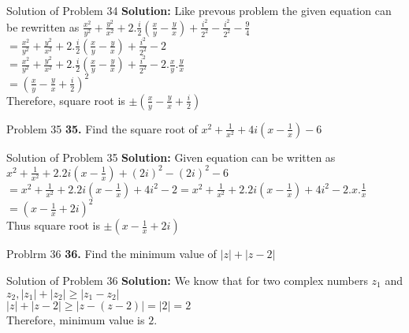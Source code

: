 \documentclass[aspectratio=169,8pt]{beamer}
\begin{document}
\begin{frame}{Solution of Problem 34}
  \textbf{Solution:} Like prevous problem the given equation can be rewritten as $\frac{x^2}{y^2} + \frac{y^2}{x^2} + 2.\frac{i}{2}\left(\frac{x}{y} - \frac{y}{x}\right) + \frac{i^2}{2^2} - \frac{i^2}{2^2} - \frac{9}{4}$\\
  \vspace*{0.2cm}
  $= \frac{x^2}{y^2} + \frac{y^2}{x^2} + 2.\frac{i}{2}\left(\frac{x}{y} - \frac{y}{x}\right) + \frac{i^2}{2^2} - 2$\\
  \vspace*{0.2cm}
  $= \frac{x^2}{y^2} + \frac{y^2}{x^2} + 2.\frac{i}{2}\left(\frac{x}{y} - \frac{y}{x}\right) + \frac{i^2}{2^2} - 2.\frac{x}{y}.\frac{y}{x}$\\
  \vspace*{0.2cm}
  $= \left(\frac{x}{y} - \frac{y}{x} + \frac{i}{2}\right)^2$\\
  \vspace*{0.2cm}
  Therefore, square root is $\pm\left(\frac{x}{y} - \frac{y}{x} + \frac{i}{2}\right)$
\end{frame}
\begin{frame}{Problem 35}
  \textbf{35.} Find the square root of $x^2 + \frac{1}{x^2} + 4i\left(x - \frac{1}{x}\right) - 6$
\end{frame}
\begin{frame}{Solution of Problem 35}
  \textbf{Solution:} Given equation can be written as $x^2 + \frac{1}{x^2} + 2.2i\left(x - \frac{1}{x}\right) + (2i)^2 - (2i)^2 - 6$\\
  \vspace*{0.2cm}
  $= x^2 + \frac{1}{x^2} + 2.2i\left(x - \frac{1}{x}\right) + 4i^2 - 2 = x^2 + \frac{1}{x^2} + 2.2i\left(x - \frac{1}{x}\right) + 4i^2 - 2.x.\frac{1}{x}$\\
  \vspace*{0.2cm}
  $= \left(x - \frac{1}{x} + 2i\right)^2$\\
  \vspace*{0.2cm}
  Thus square root is $\pm\left(x - \frac{1}{x} + 2i\right)$
\end{frame}
\begin{frame}{Problrm 36}
  \textbf{36.} Find the minimum value of $|z| + |z - 2|$
\end{frame}
\begin{frame}{Solution of Problem 36}
  \textbf{Solution:} We know that for two complex numbers $z_1$ and $z_2, |z_1| + |z_2|\geq |z_1 - z_2|$\\
  \vspace*{0.2cm}
  $|z| + |z - 2| \geq |z - (z - 2)| = |2| = 2$\\
  \vspace*{0.2cm}
  Therefore, minimum value is $2$.
\end{frame}
\end{document}
